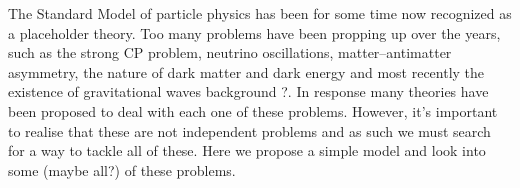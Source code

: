 \documentclass[11pt]{article}
\renewcommand{\(}{\left(}
\renewcommand{\)}{\right)}
\renewcommand{\[}{\left[}
\renewcommand{\]}{\right]}
\begin{document}
\TitlePage
  \vspace*{55mm}
       {
       The Standard Model of particle physics has been for some time now recognized as a placeholder theory. Too many problems have been propping up over the years, such as the strong CP problem, neutrino oscillations, matter–antimatter asymmetry, the nature of dark matter and dark energy and most recently the {\color{blue} existence of gravitational waves background ?}. In response many theories have been proposed to deal with each one of these problems. However, it's important to realise that these are not independent problems and as such we must search for a way to tackle all of these. Here we propose a simple model and look into some (maybe all?) of these problems. 
       }
\EndTitlePage
\titlepage\ \endtitlepage %


\tableofcontents

\cleardoublepage
\listoffigures

\cleardoublepage
\listoftables

\cleardoublepage

\setcounter{page}{1}

















\end{document}
